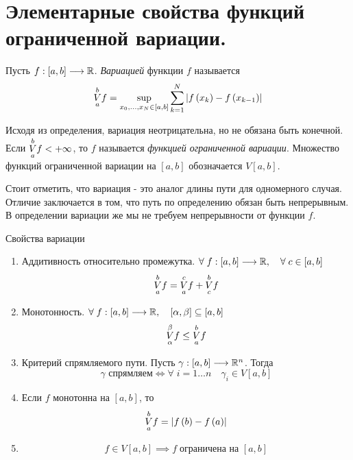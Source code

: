 \documentclass[../main.tex]{subfiles}
\begin{document}
\newpage
\section{Элементарные свойства функций ограниченной вариации.}
Пусть \( f: \left[ a,b\right] \longrightarrow \mathbb{R} \). \emph{Вариацией} функции \( f\) называется 
\[ \underset{a}{\overset{b}{V}}f= \sup\limits_{ x_0, \ldots , x_N \in \left[ a,b\right]} \sum\limits_{ k=1}^{ N} \left| f\left( x_k\right)-f\left( x_{k-1}\right)\right|\]

Исходя из определения, вариация неотрицательна, но не обязана быть конечной. Если \( \underset{ a}{\overset{ b}{V}} f < + \infty \), то \( f\) называется \emph{функцией ограниченной вариации}. Множество функций ограниченной вариации на \( \left[ a,b\right]\) обозначается \( V\left[ a,b\right]\).

Стоит отметить, что вариация - это аналог длины пути для одномерного случая. Отличие заключается в том, что путь по определению обязан быть непрерывным. В определении вариации же мы не требуем непрерывности от функции \( f\).

\begin{prop}{\hypertarget{thm:variatsiya_prop}{Свойства вариации}}
    \begin{enumerate}
        \item Аддитивность относительно промежутка. \( \forall \; f:\left[ a,b\right] \longrightarrow \mathbb{R},\quad \forall \; c \in \left[ a,b\right] \)
        \[ \underset{ a}{\overset{ b}{V}} f= \underset{ a}{\overset{ c}{V}} f+ \underset{ c}{\overset{ b}{V}} f\]
        \item Монотонность. \( \forall \; f:\left[ a,b\right] \longrightarrow \mathbb{R} ,\quad \left[ \alpha , \beta \right] \subseteq \left[ a,b\right]\)
        \[ \underset{ \alpha }{\overset{ \beta }{V}} f \leq \underset{ a}{\overset{ b}{V}} f\]
        \item Критерий спрямляемого пути. Пусть \( \gamma : \left[ a,b\right] \longrightarrow \mathbb{R} ^n \). Тогда 
        \[ \gamma \text{ спрямляем} \Longleftrightarrow \forall \; i=1 \ldots n\quad \gamma _i \in V\left[ a,b\right]\] 
        \item Если \( f\) монотонна на \( \left[ a,b\right]\), то 
        \[ \underset{ a}{\overset{ b}{V}} f = \left| f\left( b\right)-f\left( a\right)\right|\]
        \item \[ f \in V\left[ a,b\right] \implies f\; \text{ограничена на } \left[ a,b\right]\]
    \end{enumerate}
\end{prop}
\end{document}
